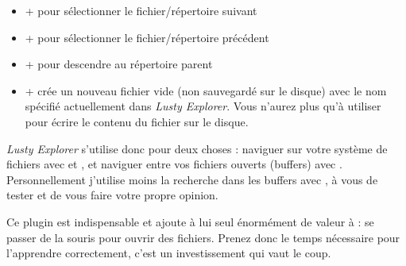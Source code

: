 \begin{itemize}
    \item \tctrl + \tn pour sélectionner le fichier/répertoire suivant
    \item \tctrl + \tp pour sélectionner le fichier/répertoire précédent
    \item \tctrl + \tw pour descendre au répertoire parent
    \item \tctrl + \te crée un nouveau fichier vide (non sauvegardé sur le disque) avec le nom spécifié actuellement dans \emph{Lusty Explorer}. Vous n'aurez plus qu'à utiliser  pour écrire le contenu du fichier sur le disque.
\end{itemize}

\emph{Lusty Explorer} s'utilise donc pour deux choses : naviguer sur votre système de fichiers avec  et , et naviguer entre vos fichiers ouverts (buffers) avec . Personnellement j'utilise moins la recherche dans les buffers avec , à vous de tester et de vous faire votre propre opinion.

Ce plugin est indispensable et ajoute à lui seul énormément de valeur à \vim : se passer de la souris pour ouvrir des fichiers. Prenez donc le temps nécessaire pour l'apprendre correctement, c'est un investissement qui vaut le coup.
